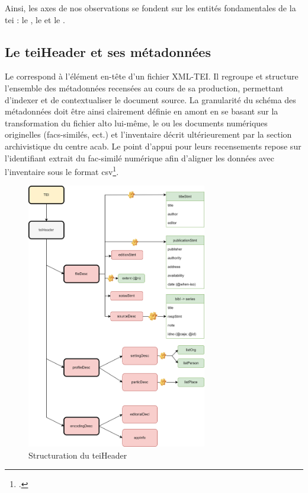 	Ainsi, les axes de nos observations se fondent sur les entités fondamentales de la \gls{tei} : le , le  et le .
	
	\subsection{Le teiHeader et ses métadonnées}
	
	Le  correspond à l'élément en-tête d'un fichier XML-TEI. Il regroupe et structure l'ensemble des métadonnées recensées au cours de sa production, permettant d'indexer et de contextualiser le document source. La granularité du schéma des métadonnées doit être ainsi clairement définie en amont en se basant sur la transformation du fichier \gls{alto} lui-même, le ou les documents numériques originelles (facs-similés, ect.) et l'inventaire décrit ultérieurement par la section archivistique du centre \gls{acab}. Le point d'appui pour leurs recensements repose sur l'identifiant extrait du fac-similé numérique afin d'aligner les données avec l'inventaire sous le format \gls{csv}\footcite[voir le fichier ./src/opt/inventory.py ;][]{humeauTeiTransformation2022}.
	
	\begin{figure}[h!]
	    \centering
	    \includegraphics[width=0.7\textwidth]{annexes/schema/teiheader.png}
	    \caption{Structuration du teiHeader}
	    \label{fig:teiheader}
	\end{figure}
	
